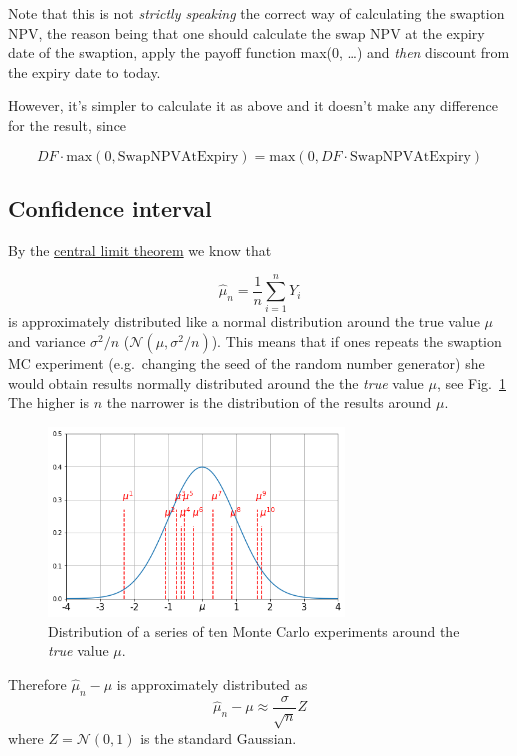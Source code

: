Note that this is not \emph{strictly speaking} the correct way of
calculating the swaption NPV, the reason being that one should calculate
the swap NPV at the expiry date of the swaption, apply the payoff
function max(0, \ldots{}) and \emph{then} discount from the expiry date
to today.

However, it's simpler to calculate it as above and it doesn't make any
difference for the result, since

\[ DF\cdot \mathrm{max}(0, \mathrm{SwapNPVAtExpiry}) = \mathrm{max}(0, DF \cdot\mathrm{SwapNPVAtExpiry}) \]

\subsection{Confidence interval}\label{confidence-interval}

By the \href{https://en.wikipedia.org/wiki/Central_limit_theorem}{central limit theorem} we know that 

\[ \hat{\mu}_n = \frac{1}{n}\sum_{i=1}^{n}Y_i\]
is approximately distributed like a normal distribution around the true value $\mu$ and variance $\sigma^2 /n$ ($\mathcal{N}(\mu ,\sigma^2 /n)$). 
This means
that if ones repeats the swaption MC experiment (e.g.~changing the seed
of the random number generator) she would obtain results normally
distributed around the the \emph{true} value \(\mu\), see Fig.~\ref{fig:repeated_MC}
The higher is \(n\) the narrower is the distribution of the results
around \(\mu\).

\begin{figure}[htb]
	\centering
	\includegraphics[width=0.7\textwidth]{lesson4_files/lesson4_33_0.png}
	\caption{Distribution of a series of ten Monte Carlo experiments around the \emph{true} value $\mu$.}
	\label{fig:repeated_MC}
\end{figure}

Therefore \( \hat{\mu}_n - \mu \) is approximately distributed as 
\[ \hat{\mu}_n - \mu \approx \frac{\sigma}{\sqrt{n}}Z \]
where $Z=\mathcal{N}(0, 1)$ is the standard Gaussian.

